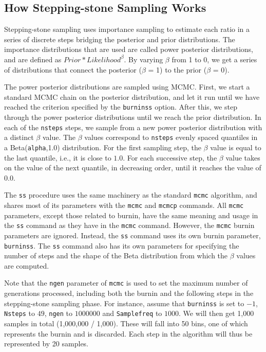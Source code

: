 \documentclass[12pt]{book}
\newcommand{\ttt}[1]{\texttt{#1}}
\begin{document}
\subsection{How Stepping-stone Sampling Works}

Stepping-stone sampling uses importance sampling to estimate each ratio in a series of discrete
steps bridging the posterior and prior distributions. The importance distributions that are used
are called power posterior distributions, and are defined as $Prior*Likelihood^{\beta}$. By varying
$\beta$ from 1 to 0, we get a series of distributions that connect the posterior ($\beta$ = 1) to
the prior ($\beta$ = 0).

The power posterior distributions are sampled using MCMC. First, we start a standard MCMC chain on
the posterior distribution, and let it run until we have reached the criterion specified by the
\ttt{burninss} option. After this, we step through the power posterior distributions until we reach
the prior distribution. In each of the \ttt{nsteps} steps, we sample from a new power posterior
distribution with a distinct $\beta$ value. The $\beta$ values correspond to \ttt{nsteps} evenly
spaced quantiles in a Beta(\ttt{alpha},1.0) distribution. For the first sampling step, the $\beta$
value is equal to the last quantile, i.e., it is close to $1.0$. For each successive step, the
$\beta$ value takes on the value of the next quantile, in decreasing order, until it reaches the
value of $0.0$.

The \ttt{ss} procedure uses the same machinery as the standard \ttt{mcmc} algorithm, and shares
most of its parameters with the \ttt{mcmc} and \ttt{mcmcp} commands. All \ttt{mcmc} parameters,
except those related to burnin, have the same meaning and usage in the \ttt{ss} command as they
have in the \ttt{mcmc} command. However, the \ttt{mcmc} burnin parameters are ignored. Instead, the
\ttt{ss} command uses its own burnin parameter, \ttt{burninss}. The \ttt{ss} command also has its
own parameters for specifying the number of steps and the shape of the Beta distribution from which
the $\beta$ values are computed.

Note that the \ttt{ngen} parameter of \ttt{mcmc} is used to set the maximum number of generations
processed, including both the burnin and the following steps in the stepping-stone sampling phase.
For instance, assume that \ttt{burninss} is set to $-1$, \ttt{Nsteps} to $49$, \ttt{ngen} to
$1000000$ and \ttt{Samplefreq} to $1000$. We will then get 1,000 samples in total (1,000,000 /
1,000). These will fall into 50 bins, one of which represents the burnin and is discarded. Each
step in the algorithm will thus be represented by 20 samples.
\end{document}
